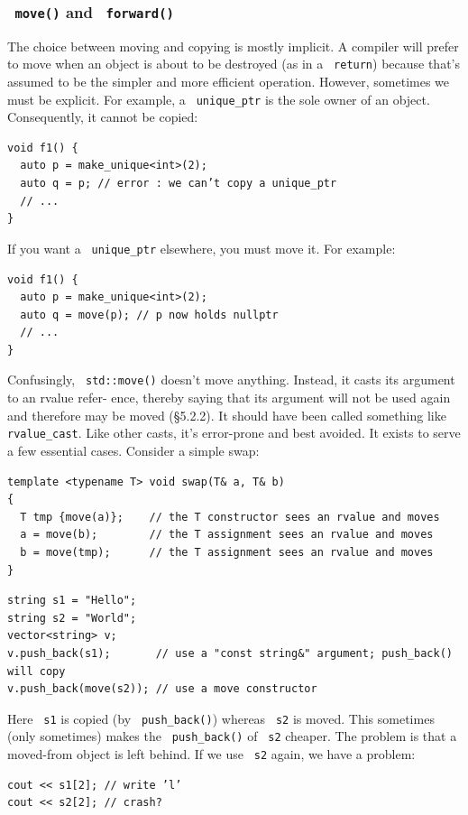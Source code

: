 \documentclass[11pt]{article}
\let\OldTexttt\texttt
\renewcommand{\texttt}[1]{\OldTexttt{\color{MidnightBlue} #1}}
\begin{document}
\subsubsection{\texttt{move()} and \texttt{forward()}}
\label{sec:org22f5c42}
The choice between moving and copying is mostly implicit. A compiler will prefer to move
when an object is about to be destroyed (as in a \texttt{return}) because that’s assumed to be the
simpler and more efficient operation. However, sometimes we must be explicit. For example, a
\texttt{unique\_ptr} is the sole owner of an object. Consequently, it cannot be copied:
\begin{verbatim}
void f1() {
  auto p = make_unique<int>(2);
  auto q = p; // error : we can’t copy a unique_ptr
  // ...
}
\end{verbatim}

If you want a \texttt{unique\_ptr} elsewhere, you must move it. For example:
\begin{verbatim}
void f1() {
  auto p = make_unique<int>(2);
  auto q = move(p); // p now holds nullptr
  // ...
}
\end{verbatim}

Confusingly, \texttt{std::move()} doesn't move anything. Instead, it casts its argument to an rvalue
refer- ence, thereby saying that its argument will not be used again and therefore may be moved
(§5.2.2). It should have been called something like \texttt{rvalue\_cast}. Like other casts, it's
error-prone and best avoided. It exists to serve a few essential cases. Consider a simple swap:
\begin{verbatim}
template <typename T> void swap(T& a, T& b)
{
  T tmp {move(a)};    // the T constructor sees an rvalue and moves
  a = move(b);        // the T assignment sees an rvalue and moves
  b = move(tmp);      // the T assignment sees an rvalue and moves                
}
\end{verbatim}

\begin{verbatim}
string s1 = "Hello";
string s2 = "World";
vector<string> v;
v.push_back(s1);       // use a "const string&" argument; push_back() will copy
v.push_back(move(s2)); // use a move constructor
\end{verbatim}

Here \texttt{s1} is copied (by \texttt{push\_back()}) whereas \texttt{s2} is moved. This sometimes (only sometimes) makes
the \texttt{push\_back()} of \texttt{s2} cheaper. The problem is that a moved-from object is left behind. If we use
\texttt{s2} again, we have a problem:
\begin{verbatim}
cout << s1[2]; // write ’l’
cout << s2[2]; // crash?
\end{verbatim}
\end{document}
